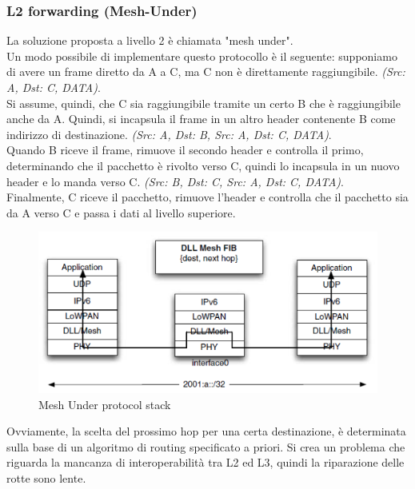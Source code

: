 \documentclass{article}
\begin{document}
\subsubsection{L2 forwarding (Mesh-Under)}
La soluzione proposta a livello 2 è chiamata "mesh under".\\
Un modo possibile di implementare questo protocollo è il seguente: supponiamo di avere un frame diretto da A a C, ma C non è direttamente raggiungibile. \textit{(Src: A, Dst: C, DATA)}.\\
Si assume, quindi, che C sia raggiungibile tramite un certo B che è raggiungibile anche da A. Quindi, si incapsula il frame in un altro header contenente B come indirizzo di destinazione. \textit{(Src: A, Dst: B, Src: A, Dst: C, DATA)}.\\
Quando B riceve il frame, rimuove il secondo header e controlla il primo, determinando che il pacchetto è rivolto verso C, quindi lo incapsula in un nuovo header e lo manda verso C. \textit{(Src: B, Dst: C, Src: A, Dst: C, DATA)}.\\
Finalmente, C riceve il pacchetto, rimuove l'header e controlla che il pacchetto sia da A verso C e passa i dati al livello superiore.
\begin{figure}[H]
    \centering
    \includegraphics[scale=0.4]{figures/L2 forwarding.png}
    \caption{Mesh Under protocol stack}
\end{figure}
Ovviamente, la scelta del prossimo hop per una certa destinazione, è determinata sulla base di un algoritmo di routing specificato a priori. Si crea un problema che riguarda la mancanza di interoperabilità tra L2 ed L3, quindi la riparazione delle rotte sono lente.
\end{document}
